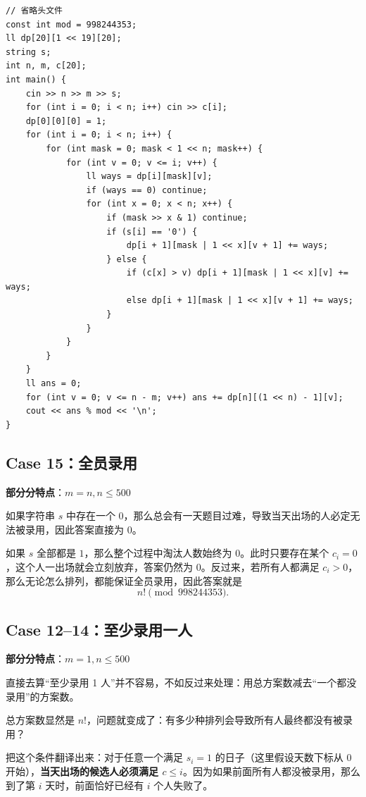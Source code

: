 \documentclass{book}
\begin{document}
\begin{lstlisting}[style = code]
// 省略头文件
const int mod = 998244353;
ll dp[20][1 << 19][20];
string s;
int n, m, c[20];
int main() {
    cin >> n >> m >> s;
    for (int i = 0; i < n; i++) cin >> c[i];
    dp[0][0][0] = 1;
    for (int i = 0; i < n; i++) {
        for (int mask = 0; mask < 1 << n; mask++) {
            for (int v = 0; v <= i; v++) {
                ll ways = dp[i][mask][v];
                if (ways == 0) continue;
                for (int x = 0; x < n; x++) {
                    if (mask >> x & 1) continue;
                    if (s[i] == '0') {
                        dp[i + 1][mask | 1 << x][v + 1] += ways;
                    } else {
                        if (c[x] > v) dp[i + 1][mask | 1 << x][v] += ways;
                        else dp[i + 1][mask | 1 << x][v + 1] += ways;
                    }
                }
            }
        }
    }
    ll ans = 0;
    for (int v = 0; v <= n - m; v++) ans += dp[n][(1 << n) - 1][v];
    cout << ans % mod << '\n';
}
\end{lstlisting}
\subsection{Case 15：全员录用}
\textbf{部分分特点}：$m = n, n \le 500$

如果字符串 $s$ 中存在一个 $0$，那么总会有一天题目过难，导致当天出场的人必定无法被录用，因此答案直接为 $0$。

如果 $s$ 全部都是 $1$，那么整个过程中淘汰人数始终为 $0$。此时只要存在某个 $c_i = 0$，这个人一出场就会立刻放弃，答案仍然为 $0$。反过来，若所有人都满足 $c_i > 0$，那么无论怎么排列，都能保证全员录用，因此答案就是
\[
n! \pmod{998244353}.
\]

\newpage
\subsection{Case 12--14：至少录用一人}

\textbf{部分分特点}：$m = 1, n \le 500$

直接去算“至少录用 1 人”并不容易，不如反过来处理：用总方案数减去“一个都没录用”的方案数。

总方案数显然是 $n!$，问题就变成了：有多少种排列会导致所有人最终都没有被录用？

把这个条件翻译出来：对于任意一个满足 $s_i = 1$ 的日子（这里假设天数下标从 $0$ 开始），\textbf{当天出场的候选人必须满足 $c \le i$}。因为如果前面所有人都没被录用，那么到了第 $i$ 天时，前面恰好已经有 $i$ 个人失败了。
\end{document}
